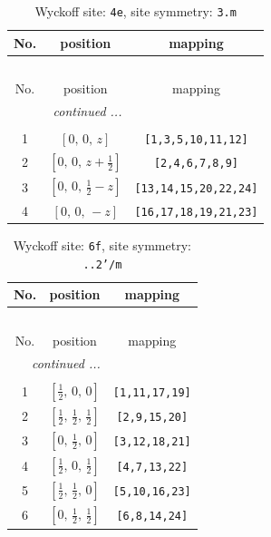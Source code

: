 \documentclass[fleqn,8pt]{jsarticle}
\begin{document}
\renewcommand{\arraystretch}{1.2}
\begin{longtable}{ccc}
\caption{Wyckoff site: {\tt 4e}, site symmetry: {\tt 3.m}}
 \\
 \hline \hline
No. & position & mapping \\ \hline \endfirsthead

\multicolumn{2}{l}{\tablename\ \thetable{}} \\
 \hline \hline
No. & position & mapping \\ \hline \endhead

 \hline \hline
\multicolumn{2}{r}{\footnotesize\it continued ...} \\ \endfoot

 \hline \hline
\multicolumn{2}{r}{} \\ \endlastfoot

1 & $\left[ 0,\, 0,\, z \right]$ & {\tt [1,3,5,10,11,12]} \\ \hline
2 & $\left[ 0,\, 0,\, z + \frac{1}{2} \right]$ & {\tt [2,4,6,7,8,9]} \\ \hline
3 & $\left[ 0,\, 0,\, \frac{1}{2} - z \right]$ & {\tt [13,14,15,20,22,24]} \\ \hline
4 & $\left[ 0,\, 0,\, - z \right]$ & {\tt [16,17,18,19,21,23]} \\
\end{longtable}
\renewcommand{\arraystretch}{1.2}
\begin{longtable}{ccc}
\caption{Wyckoff site: {\tt 6f}, site symmetry: {\tt ..2'/m}}
 \\
 \hline \hline
No. & position & mapping \\ \hline \endfirsthead

\multicolumn{2}{l}{\tablename\ \thetable{}} \\
 \hline \hline
No. & position & mapping \\ \hline \endhead

 \hline \hline
\multicolumn{2}{r}{\footnotesize\it continued ...} \\ \endfoot

 \hline \hline
\multicolumn{2}{r}{} \\ \endlastfoot

1 & $\left[ \frac{1}{2},\, 0,\, 0 \right]$ & {\tt [1,11,17,19]} \\ \hline
2 & $\left[ \frac{1}{2},\, \frac{1}{2},\, \frac{1}{2} \right]$ & {\tt [2,9,15,20]} \\ \hline
3 & $\left[ 0,\, \frac{1}{2},\, 0 \right]$ & {\tt [3,12,18,21]} \\ \hline
4 & $\left[ \frac{1}{2},\, 0,\, \frac{1}{2} \right]$ & {\tt [4,7,13,22]} \\ \hline
5 & $\left[ \frac{1}{2},\, \frac{1}{2},\, 0 \right]$ & {\tt [5,10,16,23]} \\ \hline
6 & $\left[ 0,\, \frac{1}{2},\, \frac{1}{2} \right]$ & {\tt [6,8,14,24]} \\
\end{longtable}
\end{document}
